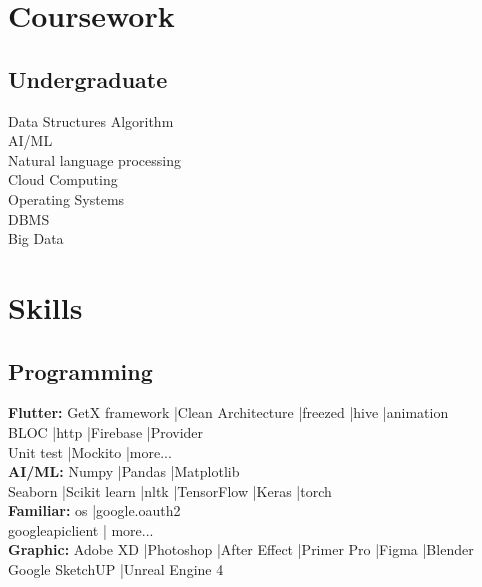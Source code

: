 \documentclass[]{resume}
\begin{document}
\begin{minipage}[t]{0.33\textwidth}

\section{Coursework}
\subsection{Undergraduate}
Data Structures Algorithm\\
AI/ML\\
Natural language processing\\
Cloud Computing\\
Operating Systems\\
DBMS\\
Big Data\\
\sectionsep


\section{Skills}
\subsection{Programming}
\textbf{Flutter: }GetX framework |Clean
Architecture |freezed |hive |animation\\BLOC |http |Firebase |Provider \\Unit test |Mockito |more...\\
\textbf{AI/ML: }Numpy |Pandas |Matplotlib\\Seaborn |Scikit learn |nltk |TensorFlow |Keras |torch\\
\textbf{Familiar: }os |google.oauth2\\googleapiclient | more...\\
\textbf{Graphic: }Adobe XD |Photoshop |After Effect |Primer Pro |Figma |Blender\\Google SketchUP |Unreal Engine 4\\

%
%

\end{minipage} 
\hfill
\end{document}

